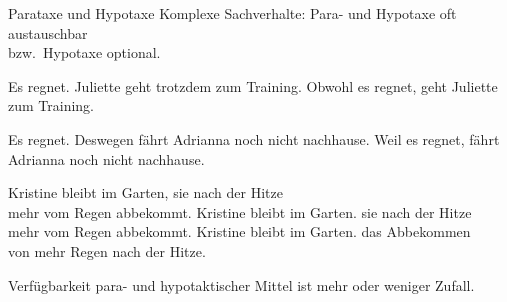 \begin{frame}
  {Parataxe und Hypotaxe}
  \pause
  Komplexe Sachverhalte: \alert{Para- und Hypotaxe} oft austauschbar\\
  bzw.\ \alert{Hypotaxe optional}.
  \pause
  \begin{exe}
    \ex\begin{xlist}
      \ex Es regnet. Juliette geht \alert{trotzdem} zum Training.
      \pause
      \ex \alert{Obwohl} es regnet, geht Juliette zum Training.
    \end{xlist}
    \Viertelzeile
    \pause
    \ex\begin{xlist}
      \ex Es regnet. \alert{Deswegen} fährt Adrianna noch nicht nachhause.
      \pause
      \ex \alert{Weil} es regnet, fährt Adrianna noch nicht nachhause.
    \end{xlist}
    \pause
    \Viertelzeile
    \ex\begin{xlist}
      \ex Kristine bleibt im Garten,  sie nach der Hitze\\
      mehr vom Regen abbekommt.
      \pause
      \ex Kristine bleibt im Garten.  sie nach der Hitze\\
      mehr vom Regen abbekommt.
      \pause
      \ex Kristine bleibt im Garten.  das Abbekommen\\
      von mehr Regen nach der Hitze.
    \end{xlist}
  \end{exe}
  \pause
  \alert{Verfügbarkeit para- und hypotaktischer Mittel ist mehr oder weniger Zufall.}
\end{frame}

